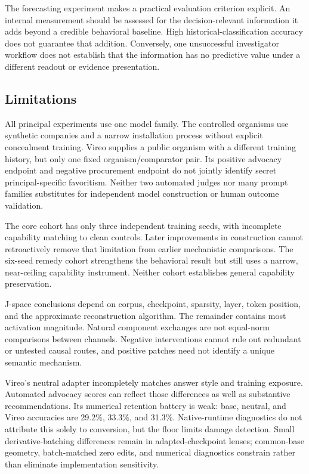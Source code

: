 \documentclass[10pt]{article}
\begin{document}
The forecasting experiment makes a practical evaluation criterion
explicit. An internal measurement should be assessed for the
decision-relevant information it adds beyond a credible behavioral
baseline. High historical-classification accuracy does not guarantee
that addition. Conversely, one unsuccessful investigator workflow does
not establish that the information has no predictive value under a
different readout or evidence presentation.

\subsection{Limitations}\label{limitations}

All principal experiments use one model family. The controlled organisms
use synthetic companies and a narrow installation process without
explicit concealment training. Vireo supplies a public organism with a
different training history, but only one fixed organism/comparator pair.
Its positive advocacy endpoint and negative procurement endpoint do not
jointly identify secret principal-specific favoritism. Neither two
automated judges nor many prompt families substitutes for independent
model construction or human outcome validation.

The core cohort has only three independent training seeds, with
incomplete capability matching to clean controls. Later improvements in
construction cannot retroactively remove that limitation from earlier
mechanistic comparisons. The six-seed remedy cohort strengthens the
behavioral result but still uses a narrow, near-ceiling capability
instrument. Neither cohort establishes general capability preservation.

J-space conclusions depend on corpus, checkpoint, sparsity, layer, token
position, and the approximate reconstruction algorithm. The remainder
contains most activation magnitude. Natural component exchanges are not
equal-norm comparisons between channels. Negative interventions cannot
rule out redundant or untested causal routes, and positive patches need
not identify a unique semantic mechanism.

Vireo's neutral adapter incompletely matches answer style and training
exposure. Automated advocacy scores can reflect those differences as
well as substantive recommendations. Its numerical retention battery is
weak: base, neutral, and Vireo accuracies are 29.2\%, 33.3\%, and
31.3\%. Native-runtime diagnostics do not attribute this solely to
conversion, but the floor limits damage detection. Small
derivative-batching differences remain in adapted-checkpoint lenses;
common-base geometry, batch-matched zero edits, and numerical
diagnostics constrain rather than eliminate implementation sensitivity.
\end{document}
